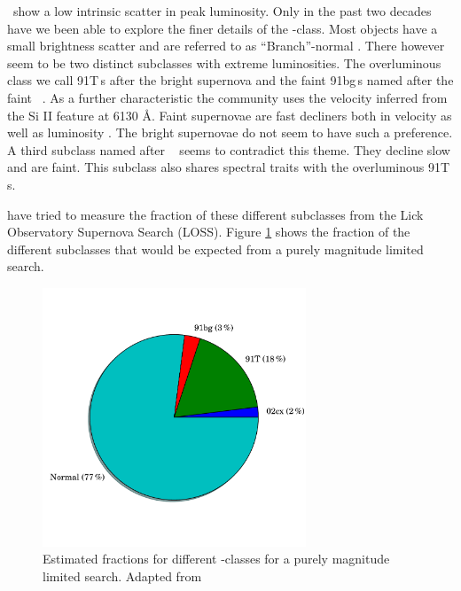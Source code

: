 \sneia\ show a low intrinsic scatter in peak luminosity. Only in the past two decades have we been able to explore the finer details of the \sneia-class.
Most objects have a small brightness scatter and are referred to as ``Branch''-normal \citep{1993AJ....106.2383B}. 
There however seem to be two distinct subclasses with extreme luminosities. The overluminous class we call 91T\,s after the bright supernova  \citet{1992AJ....103.1632P, 1994ApJ...434L..19S} and the faint 91bg\,s named after the faint \ \citep{1992AJ....104.1543F}.  As a further characteristic the community uses the velocity inferred from the Si II feature at 6130 \AA.
Faint supernovae are fast decliners both in velocity as well as luminosity \citet{2005ApJ...623.1011B}. The bright supernovae do not seem to have such a preference. 
A third subclass named after \ \citep{2003PASP..115..453L} seems to contradict this theme. They decline slow and are faint. This subclass also shares spectral traits with the overluminous 91T\,s.

\citet{2011MNRAS.412.1441L} have tried to measure the fraction of these different subclasses from the Lick Observatory Supernova Search (LOSS). Figure \ref{fig:ia_fracs} shows the fraction of the different subclasses that would be expected from a purely magnitude limited search. 

\begin{figure}[htbp] %
   \centering
   \includegraphics[width=0.7\textwidth, trim=0 2.5cm 0 0cm]{chapter_intro/plots/plot_ia_fracs.pdf} 
   \caption{Estimated fractions for different \snia-classes for a purely magnitude limited search. Adapted from \citet{2011MNRAS.412.1441L}}
   \label{fig:ia_fracs}
\end{figure}

